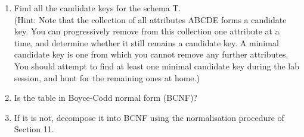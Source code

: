 \begin{enumerate}[label=\alph*.]
  \item Find all the candidate keys for the schema T.\\
  (Hint: Note that the collection of all attributes ABCDE forms a candidate key. You can progressively
  remove from this collection one attribute at a time, and determine whether it still remains a candidate key. A
  minimal candidate key is one from which you cannot remove any further attributes. You should attempt to
  find at least one minimal candidate key during the lab session, and hunt for the remaining ones at home.)
  \item Is the table in Boyce-Codd normal form (BCNF)?
  \item If it is not, decompose it into BCNF using the normalisation procedure of Section 11.
\end{enumerate}

